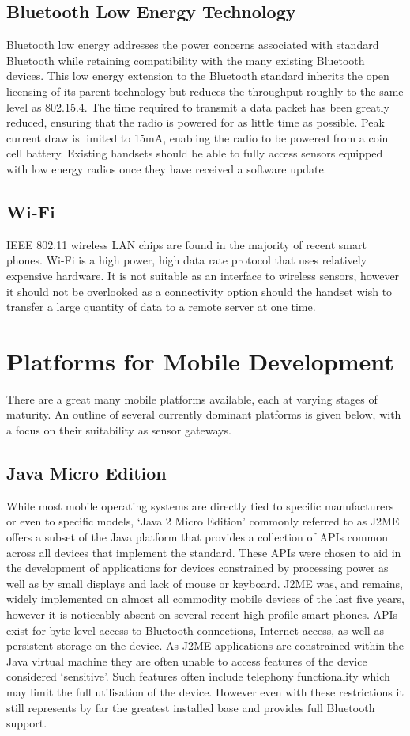 \documentclass[conference,a4paper]{IEEEtran}
\begin{document}
\subsection{Bluetooth Low Energy Technology}
Bluetooth low energy addresses the power concerns associated with standard Bluetooth while retaining compatibility with the many existing Bluetooth devices.
This low energy extension to the Bluetooth standard inherits the open licensing of its parent technology but reduces the throughput roughly to the same level as 802.15.4.
The time required to transmit a data packet has been greatly reduced, ensuring that the radio is powered for as little time as possible.
Peak current draw is limited to 15mA, enabling the radio to be powered from a coin cell battery.
Existing handsets should be able to fully access sensors equipped with low energy radios once they have received a software update.

\subsection{Wi-Fi}
IEEE 802.11 wireless LAN chips are found in the majority of recent smart phones.
Wi-Fi is a high power, high data rate protocol that uses relatively expensive hardware.
It is not suitable as an interface to wireless sensors, however it should not be overlooked as a connectivity option should the handset wish to transfer a large quantity of data to a remote server at one time.

\section{Platforms for Mobile Development\label{MobPlatforms.sec}}
There are a great many mobile platforms available, each at varying stages of maturity. An outline of several currently dominant platforms is given below, with a focus on their suitability as sensor gateways.

\subsection{Java Micro Edition}
While most mobile operating systems are directly tied to specific manufacturers or even to specific models, `Java 2 Micro Edition' commonly referred to as J2ME offers a subset of the Java platform that provides a collection of APIs common across all devices that implement the standard.
These APIs were chosen to aid in the development of applications for devices constrained by processing power as well as by small displays and lack of mouse or keyboard. 
J2ME was, and remains, widely implemented on almost all commodity mobile devices of the last five years, however it is noticeably absent on several recent high profile smart phones.
APIs exist for byte level access to Bluetooth connections, Internet access, as well as persistent storage on the device.
As J2ME applications are constrained within the Java virtual machine they are often unable to access features of the device considered `sensitive'.
Such features often include telephony functionality which may limit the full utilisation of the device.
However even with these restrictions it still represents by far the greatest installed base and provides full Bluetooth support.
\end{document}
